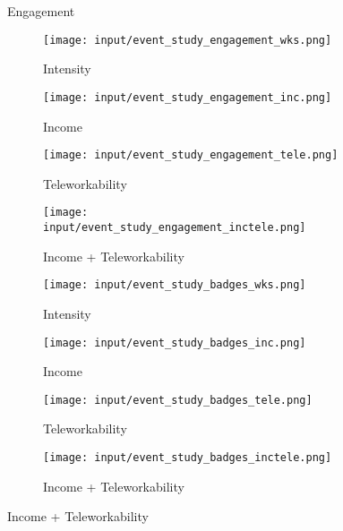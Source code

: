 \begin{figure}
  \caption{Engagement}
    \centering
    \begin{subfigure}[t]{0.45\textwidth}
    \caption{Intensity}
        \centering
        \texttt{[image: input/event\_study\_engagement\_wks.png]}
    \end{subfigure}%
    \begin{subfigure}[t]{0.45\textwidth}
    \caption{Income}
        \centering
        \texttt{[image: input/event\_study\_engagement\_inc.png]}
    \end{subfigure}%

    \begin{subfigure}[t]{0.45\textwidth}
    \caption{Teleworkability}
        \centering
        \texttt{[image: input/event\_study\_engagement\_tele.png]}
    \end{subfigure}%
    \begin{subfigure}[t]{0.45\textwidth}
    \caption{Income + Teleworkability}
        \centering
        \texttt{[image: input/event\_study\_engagement\_inctele.png]}
    \end{subfigure}%

  \caption{Badges}
    \centering
    \begin{subfigure}[t]{0.45\textwidth}
    \caption{Intensity}
        \centering
        \texttt{[image: input/event\_study\_badges\_wks.png]}
    \end{subfigure}%
    \begin{subfigure}[t]{0.45\textwidth}
    \caption{Income}
        \centering
        \texttt{[image: input/event\_study\_badges\_inc.png]}
    \end{subfigure}%

    \begin{subfigure}[t]{0.45\textwidth}
    \caption{Teleworkability}
        \centering
        \texttt{[image: input/event\_study\_badges\_tele.png]}
    \end{subfigure}%
    \begin{subfigure}[t]{0.45\textwidth}
    \caption{Income + Teleworkability}
        \centering
        \texttt{[image: input/event\_study\_badges\_inctele.png]}
    \end{subfigure}%
\end{figure}
